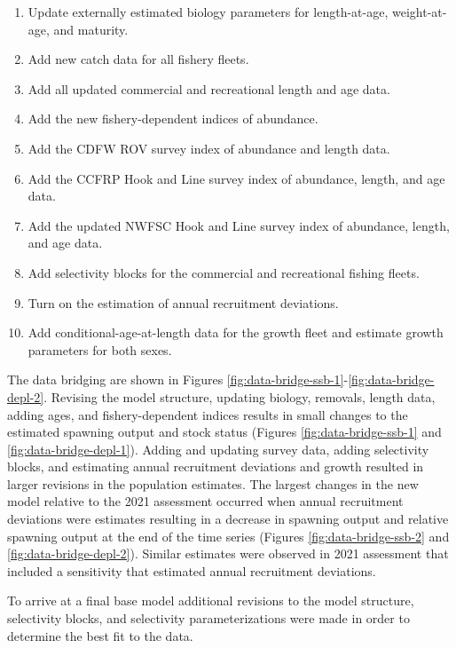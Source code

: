 \documentclass[11pt,
  english,
  letterpaper,
]{article}
\providecommand{\tightlist}{%
  \setlength{\itemsep}{0pt}\setlength{\parskip}{0pt}}
\providecommand{\tightlist}{%
  \setlength{\itemsep}{0pt}\setlength{\parskip}{0pt}}
\begin{document}
\begin{enumerate}
\def\labelenumi{\arabic{enumi}.}
\tightlist
\item
  Update externally estimated biology parameters for length-at-age, weight-at-age, and maturity.
\item
  Add new catch data for all fishery fleets.
\item
  Add all updated commercial and recreational length and age data.
\item
  Add the new fishery-dependent indices of abundance.
\item
  Add the CDFW ROV survey index of abundance and length data.
\item
  Add the CCFRP Hook and Line survey index of abundance, length, and age data.
\item
  Add the updated NWFSC Hook and Line survey index of abundance, length, and age data.
\item
  Add selectivity blocks for the commercial and recreational fishing fleets.
\item
  Turn on the estimation of annual recruitment deviations.
\item
  Add conditional-age-at-length data for the growth fleet and estimate growth parameters for both sexes.
\end{enumerate}

The data bridging are shown in Figures \ref{fig:data-bridge-ssb-1}-\ref{fig:data-bridge-depl-2}. Revising the model structure, updating biology, removals, length data, adding ages, and fishery-dependent indices results in small changes to the estimated spawning output and stock status (Figures \ref{fig:data-bridge-ssb-1} and \ref{fig:data-bridge-depl-1}). Adding and updating survey data, adding selectivity blocks, and estimating annual recruitment deviations and growth resulted in larger revisions in the population estimates. The largest changes in the new model relative to the 2021 assessment occurred when annual recruitment deviations were estimates resulting in a decrease in spawning output and relative spawning output at the end of the time series (Figures \ref{fig:data-bridge-ssb-2} and \ref{fig:data-bridge-depl-2}). Similar estimates were observed in 2021 assessment that included a sensitivity that estimated annual recruitment deviations.

To arrive at a final base model additional revisions to the model structure, selectivity blocks, and selectivity parameterizations were made in order to determine the best fit to the data.
\end{document}
